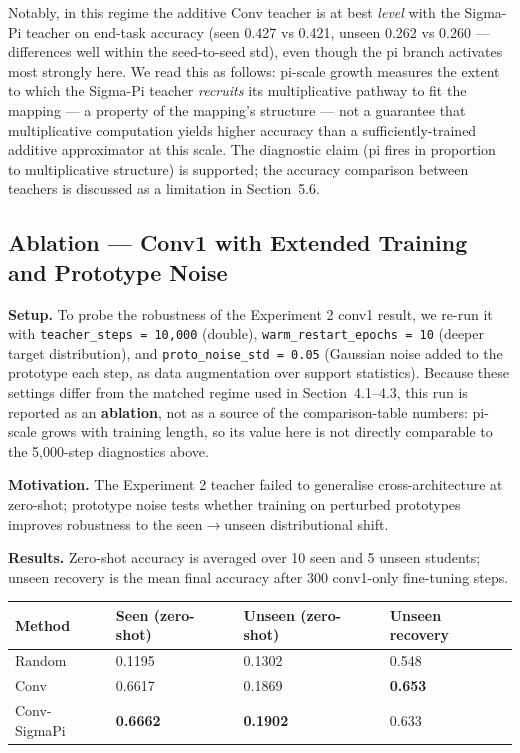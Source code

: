 \documentclass{article}
\begin{document}
Notably, in this regime the additive Conv teacher is at best \emph{level} with the Sigma-Pi teacher on end-task accuracy (seen 0.427 vs 0.421, unseen 0.262 vs 0.260 --- differences well within the seed-to-seed std), even though the pi branch activates most strongly here. We read this as follows: pi-scale growth measures the extent to which the Sigma-Pi teacher \emph{recruits} its multiplicative pathway to fit the mapping --- a property of the mapping's structure --- not a guarantee that multiplicative computation yields higher accuracy than a sufficiently-trained additive approximator at this scale. The diagnostic claim (pi fires in proportion to multiplicative structure) is supported; the accuracy comparison between teachers is discussed as a limitation in Section~5.6.

\subsection{Ablation --- Conv1 with Extended Training and Prototype Noise}\label{ablation-conv1-with-extended-training-and-prototype-noise}

\textbf{Setup.} To probe the robustness of the Experiment 2 conv1 result, we re-run it with \texttt{teacher\_steps\ =\ 10,000} (double), \texttt{warm\_restart\_epochs\ =\ 10} (deeper target distribution), and \texttt{proto\_noise\_std\ =\ 0.05} (Gaussian noise added to the prototype each step, as data augmentation over support statistics). Because these settings differ from the matched regime used in Section~4.1--4.3, this run is reported as an \textbf{ablation}, not as a source of the comparison-table numbers: pi-scale grows with training length, so its value here is not directly comparable to the 5,000-step diagnostics above.

\textbf{Motivation.} The Experiment 2 teacher failed to generalise cross-architecture at zero-shot; prototype noise tests whether training on perturbed prototypes improves robustness to the seen$\to$unseen distributional shift.

\textbf{Results.} Zero-shot accuracy is averaged over 10 seen and 5 unseen students; unseen recovery is the mean final accuracy after 300 conv1-only fine-tuning steps.

\begin{longtable}[]{@{}llll@{}}
\toprule\noalign{}
Method & Seen (zero-shot) & Unseen (zero-shot) & Unseen recovery \\
\midrule\noalign{}
\endhead
\bottomrule\noalign{}
\endlastfoot
Random & 0.1195 & 0.1302 & 0.548 \\
Conv & 0.6617 & 0.1869 & \textbf{0.653} \\
Conv-SigmaPi & \textbf{0.6662} & \textbf{0.1902} & 0.633 \\
\end{longtable}
\end{document}
